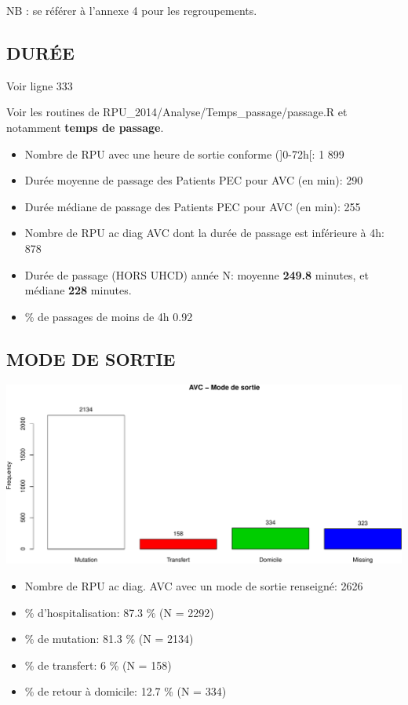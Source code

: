 \documentclass[]{article}
\begin{document}
NB : se référer à l'annexe 4 pour les regroupements.

\subsection{DURÉE}\label{duree-1}

Voir ligne 333

Voir les routines de RPU\_2014/Analyse/Temps\_passage/passage.R et
notamment \textbf{temps de passage}.

\begin{itemize}
\item
  Nombre de RPU avec une heure de sortie conforme ({]}0-72h{[}: 1 899
\item
  Durée moyenne de passage des Patients PEC pour AVC (en min): 290
\item
  Durée médiane de passage des Patients PEC pour AVC (en min): 255
\item
  Nombre de RPU ac diag AVC dont la durée de passage est inférieure à
  4h: 878
\item
  Durée de passage (HORS UHCD) année N: moyenne \textbf{249.8} minutes,
  et médiane \textbf{228} minutes.
\item
  \% de passages de moins de 4h 0.92
\end{itemize}

\subsection{MODE DE SORTIE}\label{mode-de-sortie-2}

\includegraphics{Figs/avc_mode_sortie-1.pdf}

\begin{itemize}
\itemsep1pt\parskip0pt
\item
  Nombre de RPU ac diag. AVC avec un mode de sortie renseigné: 2626
\item
  \% d'hospitalisation: 87.3 \% (N = 2292)
\item
  \% de mutation: 81.3 \% (N = 2134)
\item
  \% de transfert: 6 \% (N = 158)
\item
  \% de retour à domicile: 12.7 \% (N = 334)
\end{itemize}
\end{document}
